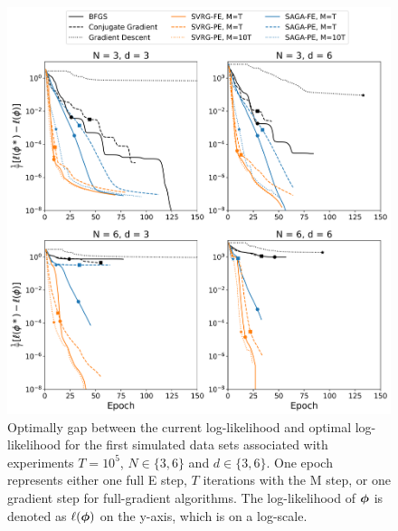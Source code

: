 \documentclass[12pt]{article}
\begin{document}
\begin{figure}[H]
    \centering
    \includegraphics[width=6.5in]{../plt/log-like_v_epoch_T-100000-000.png}
    \caption{Optimally gap between the current log-likelihood and optimal log-likelihood for the first simulated data sets associated with experiments $T=10^{5}$, $N \in \{3,6\}$ and $d \in \{3,6\}$. One epoch represents either one full E step, $T$ iterations with the M step, or one gradient step for full-gradient algorithms. The log-likelihood of $\boldsymbol{\phi}$ is denoted as $\ell(\boldsymbol{\phi})$ on the y-axis, which is on a log-scale.}
\end{figure}
%
\end{document}
